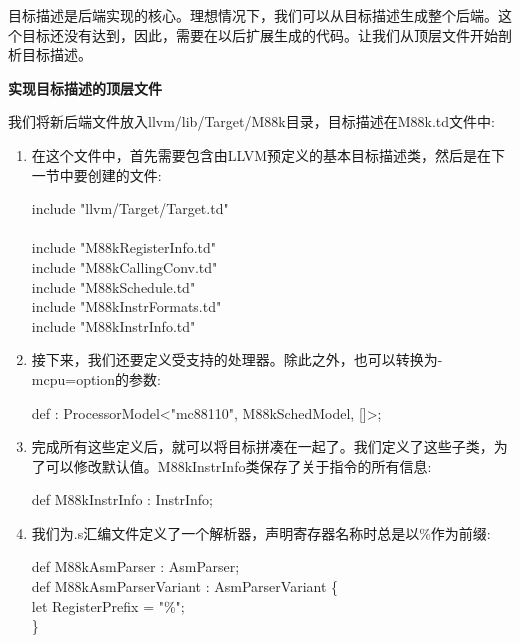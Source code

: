 
目标描述是后端实现的核心。理想情况下，我们可以从目标描述生成整个后端。这个目标还没有达到，因此，需要在以后扩展生成的代码。让我们从顶层文件开始剖析目标描述。\par

\hspace*{\fill} \par %
\textbf{实现目标描述的顶层文件}

我们将新后端文件放入llvm/lib/Target/M88k目录，目标描述在M88k.td文件中:\par

\begin{enumerate}
\item 在这个文件中，首先需要包含由LLVM预定义的基本目标描述类，然后是在下一节中要创建的文件:
\begin{tcolorbox}[colback=white,colframe=black]
include "llvm/Target/Target.td" \\
\\
include "M88kRegisterInfo.td" \\
include "M88kCallingConv.td" \\
include "M88kSchedule.td" \\
include "M88kInstrFormats.td" \\
include "M88kInstrInfo.td"
\end{tcolorbox}

\item 接下来，我们还要定义受支持的处理器。除此之外，也可以转换为-mcpu=option的参数:
\begin{tcolorbox}[colback=white,colframe=black]
def : ProcessorModel<"mc88110", M88kSchedModel, []>;
\end{tcolorbox}

\item 完成所有这些定义后，就可以将目标拼凑在一起了。我们定义了这些子类，为了可以修改默认值。M88kInstrInfo类保存了关于指令的所有信息:
\begin{tcolorbox}[colback=white,colframe=black]
def M88kInstrInfo : InstrInfo;
\end{tcolorbox}

\item 我们为.s汇编文件定义了一个解析器，声明寄存器名称时总是以\%作为前缀:
\begin{tcolorbox}[colback=white,colframe=black]
def M88kAsmParser : AsmParser; \\
def M88kAsmParserVariant : AsmParserVariant \{ \\
\hspace*{1cm}let RegisterPrefix = "\%"; \\
\}
\end{tcolorbox}


\end{enumerate}
